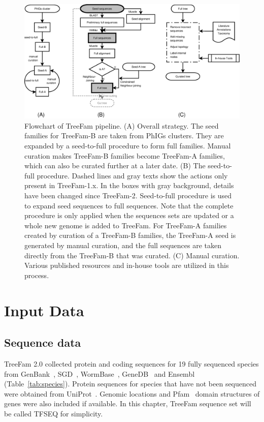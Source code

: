 \begin{figure}[!hb]
\includegraphics[width=\textwidth]{flowchart}
\caption[Flowchart of TreeFam pipeline]{Flowchart of TreeFam pipeline. (A) Overall strategy. The seed
  families for TreeFam-B are taken from PhIGs clusters. They are expanded by a seed-to-full procedure
  to form full families. Manual curation makes TreeFam-B families become TreeFam-A families, which can
  also be curated further at a later date. (B) The seed-to-full procedure. Dashed lines and gray texts show
  the actions only present in TreeFam-1.x. In the boxes with gray background, details have been changed since
  TreeFam-2. Seed-to-full procedure is used to expand seed sequences to full sequences. Note that
  the complete procedure is only applied when the sequences sets are updated or a whole new genome
  is added to TreeFam. For TreeFam-A families created by curation of a TreeFam-B families,
  the TreeFam-A seed is generated by manual curation, and the full sequences are taken directly
  from the TreeFam-B that was curated. (C) Manual curation. Various published resources and in-house tools
  are utilized in this process.}\label{fig:flowchart}
\end{figure}

\section{Input Data}
\subsection{Sequence data}
TreeFam 2.0 collected protein and coding sequences for 19 fully sequenced species from GenBank~\cite{wheeler05},
SGD~\cite{balakrishnan05}, WormBase~\cite{chen05}, GeneDB~\cite{hertzfowler04} and
Ensembl~\cite{hubbard05} (Table~\ref{tab:species}).
Protein sequences for species that have not
been sequenced were obtained from UniProt~\cite{bairoch05}. Genomic locations and Pfam~\cite{bateman04} domain
structures of genes were also included if available. In this chapter, TreeFam sequence set will be called
TFSEQ for simplicity.

